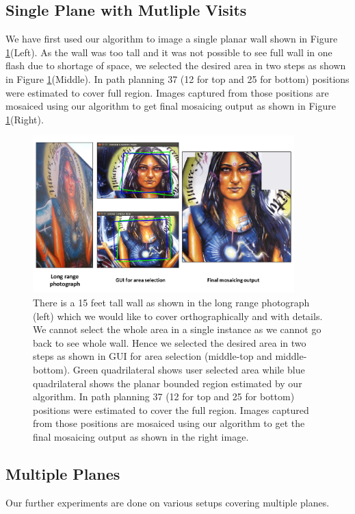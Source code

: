 \subsection{Single Plane with Mutliple Visits}
We have first used our algorithm to image a single planar wall shown in
Figure \ref{fig:resultLady}(Left). As the wall was too tall and it was not
possible to see full wall in one flash due to shortage of space, we selected the
desired area in two steps as shown in Figure  \ref{fig:resultLady}(Middle). In path planning 37 (12
for top and 25 for bottom) positions were estimated to cover full region. Images
captured from those positions are mosaiced using our algorithm to get final
mosaicing output as shown in Figure \ref{fig:resultLady}(Right).
\begin{figure}
\centering
\includegraphics[width=0.9\textwidth]{figures/multiplanar/ladyResult.pdf}
\caption[Result: Single planar scene]{There is a 15 feet tall wall as shown in
the long range photograph (left) which we would like to cover orthographically and with details. We cannot
select the whole area in a single instance as we cannot go back to see whole
wall. Hence we selected the desired area in two steps as shown in GUI for area
selection (middle-top and middle-bottom). Green quadrilateral shows user selected area
while blue quadrilateral shows the planar bounded region estimated by our
algorithm. In path planning 37 (12 for top and 25 for bottom) positions were
estimated to cover the full region. Images captured from those positions are
mosaiced using our algorithm to get the final mosaicing output as shown in the
right image.}
\label{fig:resultLady}
\end{figure}

\subsection{Multiple Planes}
Our further experiments are done on various setups covering multiple planes.\\

